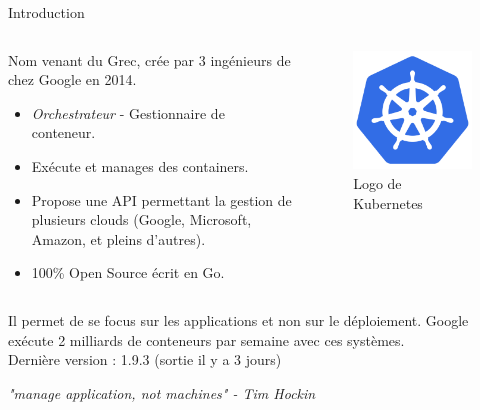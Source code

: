 \documentclass{bredelebeamer}
\begin{document}
\begin{frame}{Introduction}
\begin{columns}
\begin{column}{0.5\textwidth}

Nom venant du Grec, crée par 3 ingénieurs de chez Google en 2014.
\begin{itemize}
\item \textit{Orchestrateur} - Gestionnaire de conteneur.
\item Exécute et manages des containers.
\item Propose une API permettant la gestion de plusieurs clouds (Google, Microsoft, Amazon, et pleins d'autres).
\item 100\% Open Source écrit en Go.
\end{itemize}


\end{column}
\begin{column}{0.5\textwidth}


\begin{figure}
\centering
\includegraphics[scale=0.15]{images/img1.png}
\caption{Logo de Kubernetes}
\end{figure}

\end{column}
\end{columns}

\vspace{10px}
Il permet de se focus sur les applications et non sur le déploiement.  
Google exécute 2 milliards de conteneurs par semaine avec ces systèmes.\\\pause
\vspace{10px}
Dernière version : 1.9.3 (sortie il y a 3 jours) \\ \pause

\vspace{10px}
\begin{center}
\textit{"manage application, not machines" - Tim Hockin}
\end{center}

\end{frame}
\end{document}
